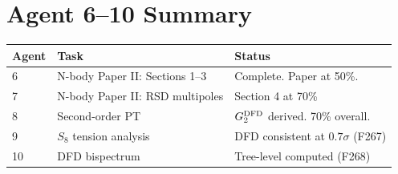 \documentclass[11pt,a4paper]{article}
\begin{document}
\section{Agent 6--10 Summary}

\begin{tcolorbox}[colback=green!5!white, colframe=dfdgreen]
\begin{center}
\begin{tabular}{lll}
\toprule
\textbf{Agent} & \textbf{Task} & \textbf{Status} \\
\midrule
6 & N-body Paper II: Sections 1--3 & Complete. Paper at 50\%. \\
7 & N-body Paper II: RSD multipoles & Section 4 at 70\% \\
8 & Second-order PT & $G_2^{\rm DFD}$ derived. 70\% overall. \\
9 & $S_8$ tension analysis & DFD consistent at $0.7\sigma$ (F267) \\
10 & DFD bispectrum & Tree-level computed (F268) \\
\bottomrule
\end{tabular}
\end{center}
\end{tcolorbox}
\end{document}
